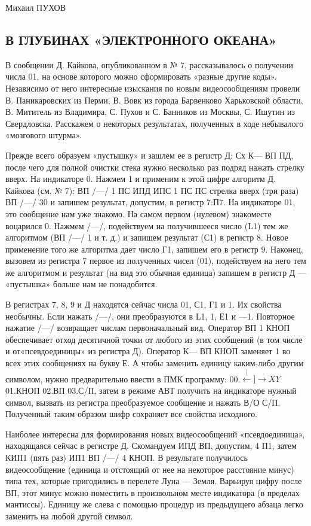 \documentclass[11pt,a4paper,oneside]{article}
\def\XY{$\stackrel[\leftarrow]{\rightarrow}{XY}$}
\begin{document}
Михаил ПУХОВ

\subsection{В ГЛУБИНАХ «ЭЛЕКТРОННОГО ОКЕАНА»}
В сообщении Д. Кайкова, опубликованном в № 7, рассказывалось о получении числа 01, на основе которого можно сформировать «разные другие коды». Независимо от него интересные изыскания по новым видеосообщениям провели В. Паникаровских из Перми, В. Вовк из города Барвенково Харьковской области, В. Мититель из Владимира, С. Пухов и С. Банников из Москвы, С. Ишутин из Свердловска. Расскажем о некоторых результатах, полученных в ходе небывалого «мозгового штурма».

Прежде всего образуем «пустышку» и зашлем ее в регистр Д: Сх К— ВП ПД, после чего для полной очистки стека нужно несколько раз подряд нажать стрелку вверх. На индикаторе 0. Нажмем 1 и применим к этой цифре алгоритм Д. Кайкова (см. № 7): ВП /—/ 1 ПС ИПД ИПС 1 ПС ПС стрелка вверх (три раза) ВП /—/ 30 и запишем результат, допустим, в регистр 7:П7. На индикаторе 01, это сообщение нам уже знакомо. На самом первом (нулевом) знакоместе воцарился 0. Нажмем /—/, подействуем на получившееся число (L1) тем же алгоритмом (ВП /—/ 1 и т. д.) и запишем результат (С1) в регистр 8. Новое применение того же алгоритма дает число Г1, запишем его в регистр 9. Наконец, вызовем из регистра 7 первое из полученных чисел (01), подействуем на него тем же алгоритмом и результат (на вид это обычная единица) запишем в регистр Д — «пустышка» больше нам не понадобится.

В регистрах 7, 8, 9 и Д находятся сейчас числа 01, С1, Г1 и 1. Их свойства необычны. Если нажать /—/, они преобразуются в L1, 1, Е1 и —1. Повторное нажатие /—/ возвращает числам первоначальный вид. Оператор ВП 1 КНОП обеспечивает отход десятичной точки от любого из этих сообщений (в том числе и от«псевдоединицы» из регистра Д). Оператор К— ВП КНОП заменяет 1 во всех этих сообщениях на букву Е. А чтобы заменить единицу каким-либо другим символом, нужно предварительно ввести в ПМК программу: 00.\XY 01.КНОП 02.ВП 03.С/П, затем в режиме АВТ получить на индикаторе нужный символ, вызвать из регистра преобразуемое сообщение и нажать В/О С/П. Полученный таким образом шифр сохраняет все свойства исходного.

Наиболее интересна для формирования новых видеосообщений «псевдоединица», находящаяся сейчас в регистре Д. Скомандуем ИПД ВП, допустим, 4 П1, затем КИП1 (пять раз) ИП1 ВП /—/ 4 КНОП. В результате получилось видеосообщение (единица и отстоящий от нее на некоторое расстояние минус) типа тех, которые пригодились в перелете Луна — Земля. Варьируя цифру после ВП, этот минус можно поместить в произвольном месте индикатора (в пределах мантиссы). Единицу же слева с помощью процедур из предыдущего абзаца легко заменить на любой другой символ.
\end{document}

